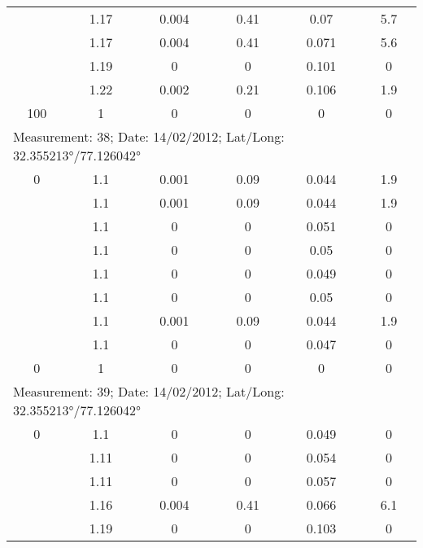 \begin{longtable}{cccccc}
		& 1.17  & 0.004 & 0.41  & 0.07  & 5.7 \\
		
		& 1.17  & 0.004 & 0.41  & 0.071 & 5.6 \\
		
		& 1.19  & 0     & 0     & 0.101 & 0 \\
		
		& 1.22  & 0.002 & 0.21  & 0.106 & 1.9 \\
		
		100   & 1     & 0     & 0     & 0     & 0 \\
		\midrule
		\multicolumn{6}{l}{Measurement: 38; Date: 14/02/2012;
			Lat/Long: 32.355213°/77.126042°} \\		
		\midrule
		0     & 1.1   & 0.001 & 0.09  & 0.044 & 1.9 \\
		
		& 1.1   & 0.001 & 0.09  & 0.044 & 1.9 \\
		
		& 1.1   & 0     & 0     & 0.051 & 0 \\
		
		& 1.1   & 0     & 0     & 0.05  & 0 \\
		
		& 1.1   & 0     & 0     & 0.049 & 0 \\
		
		& 1.1   & 0     & 0     & 0.05  & 0 \\
		
		& 1.1   & 0.001 & 0.09  & 0.044 & 1.9 \\
		
		& 1.1   & 0     & 0     & 0.047 & 0 \\
		
		0     & 1     & 0     & 0     & 0     & 0 \\
		\midrule
		\multicolumn{6}{l}{Measurement: 39; Date: 14/02/2012;
			Lat/Long: 32.355213°/77.126042°} \\		
		\midrule
		0     & 1.1   & 0     & 0     & 0.049 & 0 \\
		
		& 1.11  & 0     & 0     & 0.054 & 0 \\
		
		& 1.11  & 0     & 0     & 0.057 & 0 \\
		
		& 1.16  & 0.004 & 0.41  & 0.066 & 6.1 \\
		
		& 1.19  & 0     & 0     & 0.103 & 0 \\
		

\end{longtable}
